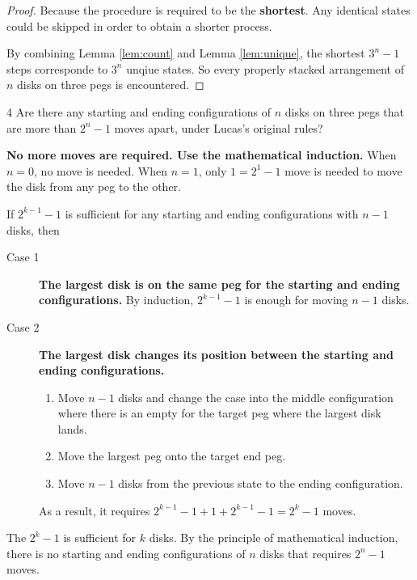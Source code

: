 \documentclass[a4paper,12pt]{article}
\makeatletter
\newtheorem*{solution}{Solution}
\theoremstyle{definition}
\renewenvironment{solution}[1][Solution] {\par\pushQED{\qed}\normalfont\topsep6\p@\@plus6\p@\relax\trivlist\item[\hskip\labelsep\bfseries#1\@addpunct{.}]\ignorespaces}{\popQED\endtrivlist\@endpefalse} \makeatother
\newenvironment{problems}{\begin{list}{}{\renewcommand{\makelabel}[1]{\textbf{##1}\hfil}}}{\end{list}}
\makeatother
\begin{document}
\begin{problems}
\begin{proof}
        Because the procedure is required to be the \textbf{shortest}. Any identical states could be skipped in order to obtain a shorter process.

        By combining Lemma \ref{lem:count} and Lemma \ref{lem:unique}, the shortest $3^n-1$ steps corresponde to $3^n$ unqiue states. So every properly stacked arrangement of $n$ disks on three pegs is encountered.
    \end{proof}

    \item[4] Are there any starting and ending configurations of $n$ disks on three pegs that are more than $2^n-1$ moves apart, under Lucas's original rules?
    
    \begin{solution}
        \textbf{No more moves are required. Use the mathematical induction.} When $n=0$, no move is needed. When $n=1$, only $1=2^1-1$ move is needed to move the disk from any peg to the other.
        
        If $2^{k-1}-1$ is sufficient for any starting and ending configurations with $n-1$ disks, then 
        \begin{description}
            \item[Case 1] \textbf{The largest disk is on the same peg for the starting and ending configurations.} By induction, $2^{k-1}-1$ is enough for moving $n-1$ disks.
            \item[Case 2] \textbf{The largest disk changes its position between the starting and ending configurations.} 
            
            \begin{enumerate}
                \item Move $n-1$ disks and change the case into the middle configuration where there is an empty for the target peg where the largest disk lands.
                \item Move the largest peg onto the target end peg.
                \item Move $n-1$ disks from the previous state to the ending configuration.
            \end{enumerate}

            As a result, it requires $2^{k-1}-1+1+2^{k-1}-1=2^k-1$ moves.
        \end{description}
        The $2^k-1$ is sufficient for $k$ disks. By the principle of mathematical induction, there is no starting and ending configurations of $n$ disks that requires $2^n-1$ moves.
    \end{solution}
    

\end{problems}
\end{document}

